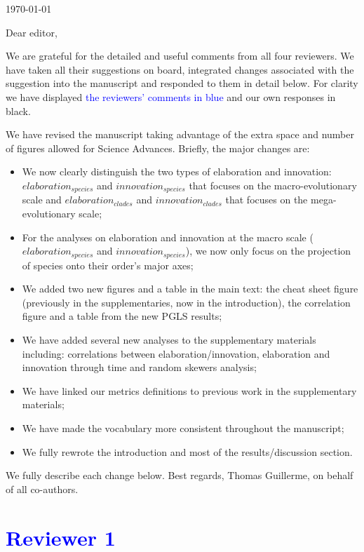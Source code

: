 \documentclass[12pt,letterpaper]{article}
\begin{document}
\noindent \today
\bigskip

\noindent Dear editor,
\bigskip

We are grateful for the detailed and useful comments from all four reviewers. We have taken all their suggestions on board, integrated changes associated with the suggestion into the manuscript and responded to them in detail below. For clarity we have displayed \textcolor{blue}{the reviewers’ comments in blue} and our own responses in black.

We have revised  the manuscript taking advantage of the extra space and number of figures allowed for Science Advances. Briefly, the major changes are:

\begin{itemize}
    \item We now clearly distinguish the two types of elaboration and innovation: $elaboration_{species}$ and $innovation_{species}$ that focuses on the macro-evolutionary scale and $elaboration_{clades}$ and $innovation_{clades}$ that focuses on the mega-evolutionary scale;
    \item For the analyses on elaboration and innovation at the macro scale ($elaboration_{species}$ and $innovation_{species}$), we now only focus on the projection of species onto their order’s major axes;
    \item We added two new figures and a table in the main text: the cheat sheet figure (previously in the supplementaries, now in the introduction), the correlation figure and a table from the new PGLS results; 
    \item We have added several new analyses to the supplementary materials including: correlations between elaboration/innovation, elaboration and innovation through time and random skewers analysis;
    \item We have linked our metrics definitions to previous work in the supplementary materials;
    \item We have made the vocabulary more consistent throughout the manuscript;
    \item We fully rewrote the introduction and most of the results/discussion section.
\end{itemize}

We fully describe each change below.
\bigskip
Best regards,
\bigskip
Thomas Guillerme, on behalf of all co-authors.

\section*{\textcolor{blue}{Reviewer 1}}
\end{document}
